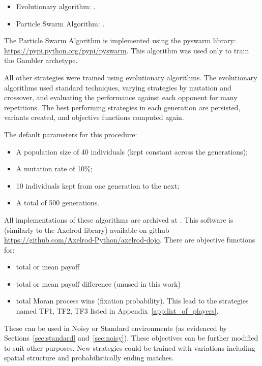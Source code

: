 \documentclass{article}
\begin{document}
\begin{itemize}
    \item Evolutionary algorithm: \cite{moriarty1999evolutionary}.
    \item Particle Swarm Algorithm: \cite{imran2013overview}.
\end{itemize}

The Particle Swarm Algorithm is implemented using the pyswarm library:
\url{https://pypi.python.org/pypi/pyswarm}. This algorithm was used only to
train the Gambler archetype.

All other strategies were trained using evolutionary algorithms. The
evolutionary algorithms used standard techniques, varying strategies by
mutation and crossover, and evaluating the performance against each opponent
for many repetitions. The best performing strategies in each generation are
persisted, variants created, and objective functions computed again.

The default parameters for this procedure:

\begin{itemize}
	\item A population size of 40 individuals (kept constant across the
        generations);
	\item A mutation rate of 10\%;
	\item 10 individuals kept from one generation to the next;
    \item A total of 500 generations.
\end{itemize}

All implementations of these algorithms are archived at
\cite{marc_harper_2017_824264}. This software is (similarly to the Axelrod
library) available on github
\url{https://github.com/Axelrod-Python/axelrod-dojo}. There are objective
functions for:

\begin{itemize}
 \item total or mean payoff
 \item total or mean payoff difference (unused in this work)
 \item total Moran process wins (fixation probability). This lead to the
     strategies named TF1, TF2, TF3 listed in
     Appendix~\ref{app:list_of_players}.
\end{itemize}

These can be used in Noisy or Standard environments (as evidenced by
Sections~\ref{sec:standard} and~\ref{sec:noisy}). These objectives can be
further modified to suit other purposes. New strategies could be trained with
variations including spatial structure and probabilistically ending matches.
\end{document}
